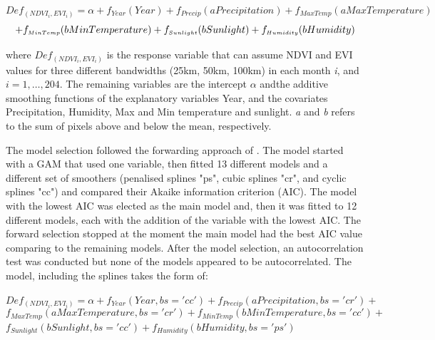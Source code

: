 \begin{flushleft}
 \hspace{4em} $Def_{\scriptscriptstyle (NDVI_{i}, EVI_{i})} = \alpha + f_{\scriptscriptstyle Year}(Year) + f_{\scriptscriptstyle Precip}(aPrecipitation) + f_{\scriptscriptstyle Max Temp}(aMax Temperature)$ 
\vspace{-0.2em}
\begin{equation}
  + f_{\scriptscriptstyle Min Temp}(bMin Temperature) +  f_{\scriptscriptstyle Sunlight}(bSunlight) + f_{\scriptscriptstyle Humidity}(bHumidity) \label{eq:10}    
\vspace{-1em}
\end{equation}
\end{flushleft}


where $Def_{\scriptscriptstyle (NDVI_{i}, EVI_{i})}$ is the response variable that can assume NDVI and EVI values for three different bandwidths (25km, 50km, 100km) in each month \textit{i}, and $i=1,\dots,204.$ The remaining variables are the intercept $\alpha$ andthe additive smoothing functions of the explanatory variables Year,  and the covariates Precipitation, Humidity, Max and Min temperature and sunlight. \textit{a} and \textit{b} refers to the sum of pixels above and below the mean, respectively.


The model selection followed the forwarding approach of \citealp[p.391]{zuur_saveliev_ieno_2014}. The model started with a GAM that used one variable, then fitted 13 different models and a different set of smoothers (penalised splines "ps", cubic splines "cr", and cyclic splines "cc") and compared their Akaike information criterion (AIC). The model with the lowest AIC was elected as the main model and, then it was fitted to 12 different models, each with the addition of the variable with the lowest AIC. The forward selection stopped at the moment the main model had the best AIC value comparing to the remaining models. After the model selection, an autocorrelation test was conducted but none of the models appeared to be autocorrelated. The model, including the splines takes the form of:

\begin{flushleft}
 \hspace{1em} $Def_{\scriptscriptstyle (NDVI_{i}, EVI_{i})} = \alpha + f_{\scriptscriptstyle Year}(Year, bs='cc') + f_{\scriptscriptstyle Precip}(aPrecipitation, bs='cr') +$ 
\begin{equation}
 f_{\scriptscriptstyle Max Temp}(aMax Temperature, bs='cr') + f_{\scriptscriptstyle Min Temp}(bMin Temperature, bs='cc') +  \label{eq:11}    
\end{equation}
 \hspace{1em} $f_{\scriptscriptstyle Sunlight}(bSunlight, bs='cc') + f_{\scriptscriptstyle Humidity}(bHumidity, bs='ps')$
\end{flushleft}


